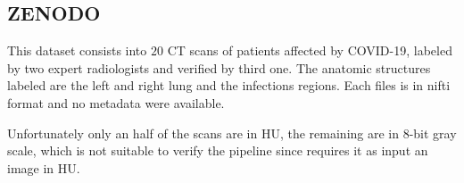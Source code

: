 \documentclass{standalone}
\begin{document}
	\subsection{ZENODO}
	This dataset consists into $20$ CT scans of patients affected by COVID-19, labeled by two expert radiologists and verified by  third one. 
	The anatomic structures labeled are the left and right lung and the infections regions. 
	Each files is in nifti format and no metadata were available.
	
	Unfortunately only an half of the scans are in HU, the remaining are in 8-bit gray scale, which is not suitable to verify the pipeline since requires it as input an image in HU.
\end{document}

